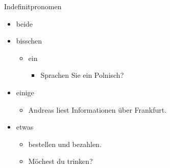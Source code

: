\begin{syntax}{Indefinitpronomen}{}
\begin{itemize}
	\item beide
	\item bisschen \begin{itemize}
			\item ein  \begin{itemize}
				\item Sprachen Sie ein  Polnisch?
			\end{itemize}
		\end{itemize}
	\item einige \begin{itemize}
			\item Andreas liest  Informationen über Frankfurt.
		\end{itemize}
	\item etwas \begin{itemize}
			\item {} bestellen und bezahlen.
			\item Möchest du  trinken?
		\end{itemize}
\end{itemize}
\end{syntax}
